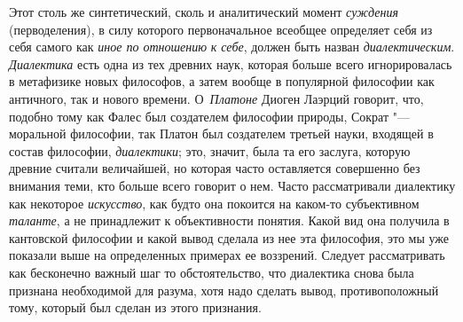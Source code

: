 Этот столь же синтетический, сколь и аналитический момент {\em суждения}
(перводеления), в силу которого первоначальное всеобщее
определяет себя из себя самого как
{\em иное по отношению} {\em к себе}, должен быть
назван {\em диалектическим}. {\em Диалектика} есть одна
из тех древних наук, которая больше всего игнорировалась в метафизике новых
философов, а затем вообще в популярной философии как античного, так и
нового времени. О~{\em Платоне}
Диоген Лаэрций говорит, что, подобно тому как Фалес был
создателем философии природы, Сократ "--- моральной философии,
так Платон был создателем третьей науки, входящей в состав философии,
{\em диалектики}; это,
значит, была та его заслуга, которую древние считали величайшей, но которая
часто оставляется совершенно без внимания теми, кто больше всего говорит о
нем. Часто рассматривали диалектику как некоторое {\em искусство}, как
будто она покоится на каком-то субъективном {\em таланте}, а не
принадлежит к объективности понятия. Какой вид она получила в кантовской
философии и какой вывод сделала из нее эта философия, это мы уже показали
выше на определенных примерах ее воззрений. Следует рассматривать как
бесконечно важный шаг то обстоятельство, что диалектика снова была признана
необходимой для разума, хотя надо сделать вывод, противоположный тому,
который был сделан из этого признания.

